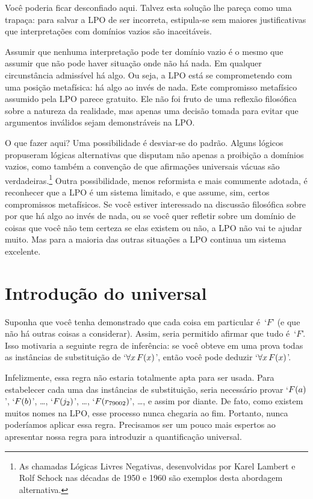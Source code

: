 Você poderia ficar desconfiado aqui. Talvez esta solução lhe pareça como uma trapaça: para salvar a LPO de ser incorreta, estipula-se sem maiores justificativas que interpretações com domínios vazios são inaceitáveis.

Assumir que nenhuma interpretação pode ter domínio vazio é o mesmo que assumir que não pode haver situação onde não há nada. Em qualquer circunstância admissível há algo.
Ou seja, a LPO está se comprometendo com uma posição metafísica: há algo ao invés de nada. Este compromisso metafísico assumido pela LPO parece gratuito. Ele não foi fruto de uma reflexão filosófica sobre a natureza da realidade, mas apenas uma decisão tomada para evitar que argumentos inválidos sejam demonstráveis na LPO.

O que fazer aqui? Uma possibilidade é desviar-se do padrão. Alguns lógicos propuseram lógicas alternativas que disputam não apenas a proibição a domínios vazios, como também a convenção de que afirmações universais vácuas são verdadeiras.\footnote{As chamadas Lógicas Livres Negativas, desenvolvidas por Karel Lambert e Rolf Schock nas décadas de 1950 e 1960 são exemplos desta abordagem alternativa.}  Outra possibilidade, menos reformista e mais comumente adotada, é reconhecer que a LPO é um sistema limitado, e que assume, sim, certos compromissos metafísicos. Se você estiver interessado na discussão filosófica sobre por que há algo ao invés de nada, ou se você quer refletir sobre um domínio de coisas que você não tem certeza se elas existem ou não, a LPO não vai te ajudar muito. Mas para a maioria das outras situações a LPO continua um sistema excelente.


\section{Introdução do universal}
Suponha que você tenha demonstrado que cada coisa em particular é~`$F$' (e que não há outras coisas a considerar). Assim, seria permitido afirmar que tudo é~`$F$'. Isso motivaria a seguinte regra de inferência:
se você obteve em uma prova todas as instâncias de substituição de `$\forall x\,\mathord{F}(x)$', então você pode deduzir `$\forall x\,\mathord{F}(x)$'. 
 
 Infelizmente, essa regra não estaria  totalmente apta para ser usada. Para estabelecer cada uma das instâncias de substituição, seria necessário provar  `$\mathord{F}(a)$', `$\mathord{F}(b)$', \dots, `$\mathord{F}(j_2)$', \dots, `$\mathord{F}(r_{79002})$', \ldots, e assim por diante. De fato, como existem muitos nomes na LPO, esse processo nunca chegaria ao fim. Portanto, nunca poderíamos aplicar essa regra. Precisamos ser um pouco mais espertos ao apresentar nossa regra para introduzir a quantificação universal.
 
